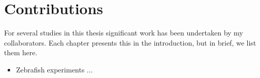 \section*{Contributions}

For several studies in this thesis significant work has been undertaken by my collaborators. Each chapter presents this in the introduction, but in brief, we list them here.

\begin{itemize}
    \item Zebrafish experiments ...
\end{itemize}